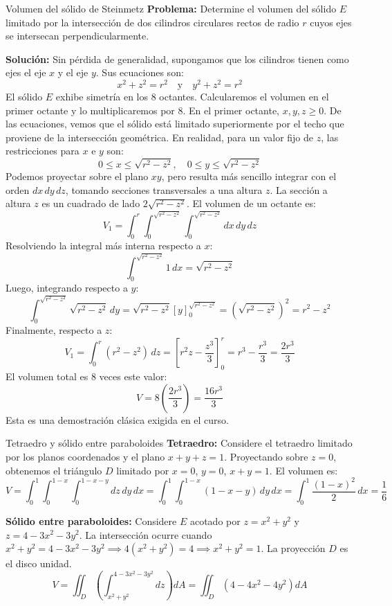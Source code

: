 \documentclass[11pt,a4paper]{article}
\begin{document}
\begin{ejemplobox}{Volumen del sólido de Steinmetz}
\textbf{Problema:} Determine el volumen del sólido $E$ limitado por la intersección de dos cilindros circulares rectos de radio $r$ cuyos ejes se intersecan perpendicularmente.

\textbf{Solución:} 
Sin pérdida de generalidad, supongamos que los cilindros tienen como ejes el eje $x$ y el eje $y$. Sus ecuaciones son:
\[ x^2 + z^2 = r^2 \quad \text{y} \quad y^2 + z^2 = r^2 \]
El sólido $E$ exhibe simetría en los $8$ octantes. Calcularemos el volumen en el primer octante y lo multiplicaremos por $8$. En el primer octante, $x, y, z \geq 0$.
De las ecuaciones, vemos que el sólido está limitado superiormente por el techo que proviene de la intersección geométrica. En realidad, para un valor fijo de $z$, las restricciones para $x$ e $y$ son:
\[ 0 \leq x \leq \sqrt{r^2 - z^2}, \quad 0 \leq y \leq \sqrt{r^2 - z^2} \]
Podemos proyectar sobre el plano $xy$, pero resulta más sencillo integrar con el orden $dx\,dy\,dz$, tomando secciones transversales a una altura $z$. La sección a altura $z$ es un cuadrado de lado $2\sqrt{r^2-z^2}$.
El volumen de un octante es:
\[ V_1 = \int_0^r \int_0^{\sqrt{r^2-z^2}} \int_0^{\sqrt{r^2-z^2}} dx\,dy\,dz \]
Resolviendo la integral más interna respecto a $x$:
\[ \int_0^{\sqrt{r^2-z^2}} 1 \,dx = \sqrt{r^2-z^2} \]
Luego, integrando respecto a $y$:
\[ \int_0^{\sqrt{r^2-z^2}} \sqrt{r^2-z^2} \,dy = \sqrt{r^2-z^2} \left[ y \right]_0^{\sqrt{r^2-z^2}} = (\sqrt{r^2-z^2})^2 = r^2 - z^2 \]
Finalmente, respecto a $z$:
\[ V_1 = \int_0^r (r^2 - z^2) \,dz = \left[ r^2 z - \frac{z^3}{3} \right]_0^r = r^3 - \frac{r^3}{3} = \frac{2r^3}{3} \]
El volumen total es $8$ veces este valor:
\[ V = 8 \left(\frac{2r^3}{3}\right) = \frac{16r^3}{3} \]
Esta es una demostración clásica exigida en el curso.
\end{ejemplobox}

\begin{ejemplobox}{Tetraedro y sólido entre paraboloides}
\textbf{Tetraedro:} Considere el tetraedro limitado por los planos coordenados y el plano $x+y+z=1$. Proyectando sobre $z=0$, obtenemos el triángulo $D$ limitado por $x=0$, $y=0$, $x+y=1$. El volumen es:
\[ V = \int_0^1 \int_0^{1-x} \int_0^{1-x-y} dz\,dy\,dx = \int_0^1 \int_0^{1-x} (1-x-y) \,dy\,dx = \int_0^1 \frac{(1-x)^2}{2} \,dx = \frac{1}{6} \]

\textbf{Sólido entre paraboloides:} Considere $E$ acotado por $z = x^2+y^2$ y $z = 4 - 3x^2 - 3y^2$. La intersección ocurre cuando $x^2+y^2 = 4 - 3x^2 - 3y^2 \implies 4(x^2+y^2) = 4 \implies x^2+y^2 = 1$. La proyección $D$ es el disco unidad.
\[ V = \iint_D \left( \int_{x^2+y^2}^{4-3x^2-3y^2} dz \right) dA = \iint_D (4 - 4x^2 - 4y^2) dA \]
\end{ejemplobox}
\end{document}
